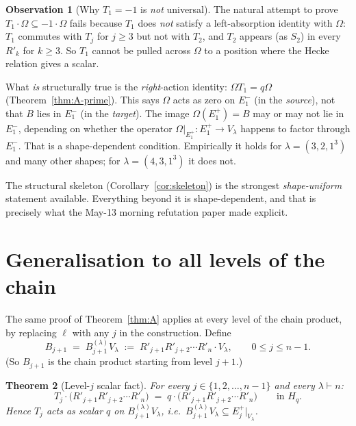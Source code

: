 \documentclass[11pt]{article}
\newtheorem{theorem}{Theorem}
\theoremstyle{definition}
\newtheorem{observation}[theorem]{Observation}
\newcommand{\Hq}{H_q}
\newcommand{\Om}{\Omega}
\begin{document}
\begin{observation}[Why $T_1 = -1$ is \emph{not} universal]
The natural attempt to prove $T_1 \cdot \Om \subseteq -1 \cdot \Om$
fails because $T_1$ does \emph{not} satisfy a left-absorption identity
with $\Om$: $T_1$ commutes with $T_j$ for $j \ge 3$ but not with $T_2$,
and $T_2$ appears (as $S_2$) in every $R'_k$ for $k \ge 3$. So
$T_1$ cannot be pulled across $\Om$ to a position where the Hecke
relation gives a scalar.

What \emph{is} structurally true is the \emph{right}-action identity:
$\Om T_1 = q \Om$ (Theorem~\ref{thm:A-prime}). This says $\Om$
acts as zero on $E_1^-$ (in the \emph{source}), not that $B$ lies
in $E_1^-$ (in the \emph{target}). The image $\Om(E_1^+) = B$ may or
may not lie in $E_1^-$, depending on whether the operator
$\Om|_{E_1^+}: E_1^+ \to V_\lambda$ happens to factor through $E_1^-$.
That is a shape-dependent condition. Empirically it holds for
$\lambda = (3,2,1^3)$ and many other shapes; for $\lambda = (4,3,1^3)$
it does not.
\end{observation}

The structural skeleton (Corollary~\ref{cor:skeleton}) is the strongest
\emph{shape-uniform} statement available. Everything beyond it is
shape-dependent, and that is precisely what the May-13 morning
refutation paper made explicit.

\section{Generalisation to all levels of the chain}\label{sec:chain-levels}

The same proof of Theorem~\ref{thm:A} applies at every level of the
chain product, by replacing $\ell$ with any $j$ in the construction.
Define
\[
   B_{j+1} \;=\; B_{j+1}^{(\lambda)} V_\lambda \;:=\;
   R'_{j+1} R'_{j+2} \cdots R'_n \cdot V_\lambda, \qquad 0 \le j \le n-1.
\]
(So $B_{j+1}$ is the chain product starting from level $j+1$.)

\begin{theorem}[Level-$j$ scalar fact]\label{thm:level-j}
For every $j \in \{1, 2, \ldots, n-1\}$ and every $\lambda \vdash n$:
\[
   T_j \cdot \big(R'_{j+1} R'_{j+2} \cdots R'_n\big) \;=\; q \cdot
   \big(R'_{j+1} R'_{j+2} \cdots R'_n\big) \qquad \text{in } \Hq.
\]
Hence $T_j$ acts as scalar $q$ on $B_{j+1}^{(\lambda)} V_\lambda$, i.e.\
$B_{j+1}^{(\lambda)} V_\lambda \subseteq E_j^+|_{V_\lambda}$.
\end{theorem}
\end{document}
